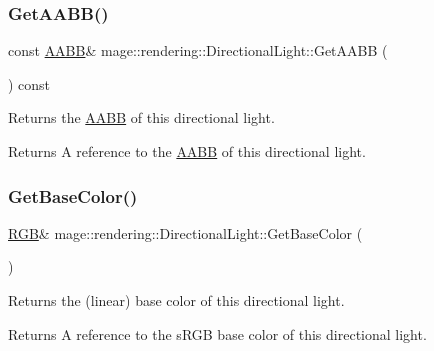 \subsubsection{\texorpdfstring{Get\+A\+A\+B\+B()}{GetAABB()}}
{\footnotesize\ttfamily const \mbox{\hyperlink{classmage_1_1_a_a_b_b}{A\+A\+BB}}\& mage\+::rendering\+::\+Directional\+Light\+::\+Get\+A\+A\+BB (\begin{DoxyParamCaption}{ }\end{DoxyParamCaption}) const\hspace{0.3cm}{\ttfamily [noexcept]}}

Returns the \mbox{\hyperlink{classmage_1_1_a_a_b_b}{A\+A\+BB}} of this directional light.

\begin{DoxyReturn}{Returns}
A reference to the \mbox{\hyperlink{classmage_1_1_a_a_b_b}{A\+A\+BB}} of this directional light. 
\end{DoxyReturn}
\mbox{\label{classmage_1_1rendering_1_1_directional_light_a492e5d6a02efa369437b606be8401985}} 
\subsubsection{\texorpdfstring{Get\+Base\+Color()}{GetBaseColor()}\hspace{0.1cm}{\footnotesize\ttfamily [1/2]}}
{\footnotesize\ttfamily \mbox{\hyperlink{structmage_1_1_r_g_b}{R\+GB}}\& mage\+::rendering\+::\+Directional\+Light\+::\+Get\+Base\+Color (\begin{DoxyParamCaption}{ }\end{DoxyParamCaption})\hspace{0.3cm}{\ttfamily [noexcept]}}

Returns the (linear) base color of this directional light.

\begin{DoxyReturn}{Returns}
A reference to the s\+R\+GB base color of this directional light. 
\end{DoxyReturn}
\mbox{\label{classmage_1_1rendering_1_1_directional_light_aca3e27ba1d32b1146d3250827c1efb5f}} 
